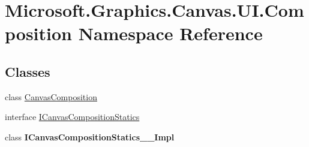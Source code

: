 \hypertarget{namespace_microsoft_1_1_graphics_1_1_canvas_1_1_u_i_1_1_composition}{}\section{Microsoft.\+Graphics.\+Canvas.\+U\+I.\+Composition Namespace Reference}
\label{namespace_microsoft_1_1_graphics_1_1_canvas_1_1_u_i_1_1_composition}
\subsection*{Classes}
\begin{DoxyCompactItemize}
\item 
class \hyperlink{class_microsoft_1_1_graphics_1_1_canvas_1_1_u_i_1_1_composition_1_1_canvas_composition}{Canvas\+Composition}
\item 
interface \hyperlink{interface_microsoft_1_1_graphics_1_1_canvas_1_1_u_i_1_1_composition_1_1_i_canvas_composition_statics}{I\+Canvas\+Composition\+Statics}
\item 
class {\bfseries I\+Canvas\+Composition\+Statics\+\_\+\+\_\+\+Impl}
\end{DoxyCompactItemize}
